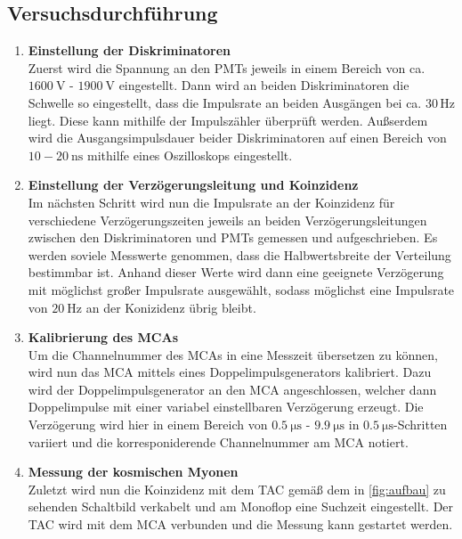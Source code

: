 \subsection{Versuchsdurchführung}
\begin{enumerate}
    \item \textbf{Einstellung der Diskriminatoren} \\
    Zuerst wird die Spannung an den PMTs jeweils in einem Bereich von ca. $\qty{1600}{\volt}$ - $\qty{1900}{\volt}$ eingestellt. 
    Dann wird an beiden Diskriminatoren die Schwelle so eingestellt, dass die Impulsrate an beiden Ausgängen bei ca. $30 \, \mathrm{Hz}$ liegt. Diese kann mithilfe der Impulszähler überprüft werden. Außserdem wird die Ausgangsimpulsdauer beider Diskriminatoren auf einen Bereich von $10-\qty{20}{\nano\second}$ mithilfe eines Oszilloskops eingestellt.
    \item \textbf{Einstellung der Verzögerungsleitung und Koinzidenz} \\
    Im nächsten Schritt wird nun die Impulsrate an der Koinzidenz für verschiedene Verzögerungszeiten jeweils an beiden Verzögerungsleitungen zwischen den Diskriminatoren und PMTs gemessen und aufgeschrieben. Es werden soviele Messwerte genommen, dass die Halbwertsbreite der Verteilung bestimmbar ist. Anhand dieser Werte wird dann eine geeignete Verzögerung mit möglichst großer Impulsrate ausgewählt, sodass möglichst eine Impulsrate von $\qty{20}{\hertz}$ an der Konizidenz übrig bleibt.
    \item \textbf{Kalibrierung des MCAs} \\
    Um die Channelnummer des MCAs in eine Messzeit übersetzen zu können, wird nun das MCA mittels eines Doppelimpulsgenerators kalibriert. Dazu wird der Doppelimpulsgenerator an den MCA angeschlossen, welcher dann Doppelimpulse mit einer variabel einstellbaren Verzögerung erzeugt. Die Verzögerung wird hier in einem Bereich von $\qty{0.5}{\micro \second}$ - $\qty{9.9}{\micro\second}$ in $\qty{0.5}{\micro \second}$-Schritten variiert und die korresponiderende Channelnummer am MCA notiert. 
    \item \textbf{Messung der kosmischen Myonen} \\
    Zuletzt wird nun die Koinzidenz mit dem TAC gemäß dem in \autoref {fig:aufbau} zu sehenden Schaltbild verkabelt und am Monoflop eine Suchzeit eingestellt. Der TAC wird mit dem MCA verbunden und die Messung kann gestartet werden. 

\end{enumerate}
\clearpage